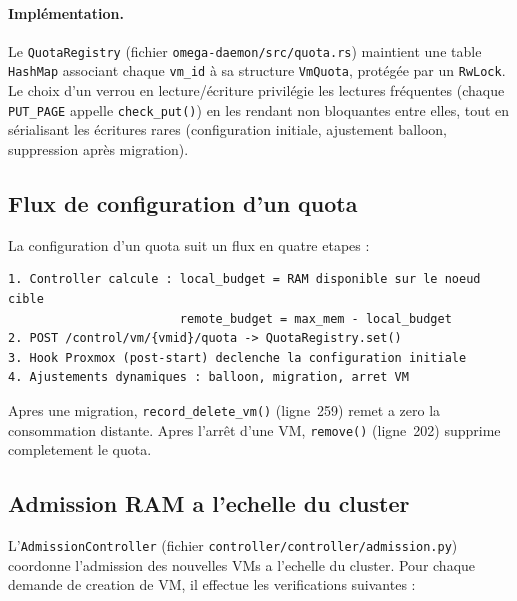 \paragraph{Implémentation.}
Le \texttt{QuotaRegistry} (fichier \texttt{omega-daemon/src/quota.rs}) maintient une table \texttt{HashMap} associant chaque \texttt{vm\_id} à sa structure \texttt{VmQuota}, protégée par un \texttt{RwLock}. Le choix d'un verrou en lecture/écriture privilégie les lectures fréquentes (chaque \texttt{PUT\_PAGE} appelle \texttt{check\_put()}) en les rendant non bloquantes entre elles, tout en sérialisant les écritures rares (configuration initiale, ajustement balloon, suppression après migration).

\subsection{Flux de configuration d'un quota}
\label{subsec:flux-quota}

La configuration d'un quota suit un flux en quatre etapes :

\begin{verbatim}
1. Controller calcule : local_budget = RAM disponible sur le noeud cible
                        remote_budget = max_mem - local_budget
2. POST /control/vm/{vmid}/quota -> QuotaRegistry.set()
3. Hook Proxmox (post-start) declenche la configuration initiale
4. Ajustements dynamiques : balloon, migration, arret VM
\end{verbatim}

Apres une migration, \texttt{record\_delete\_vm()} (ligne~259) remet a zero la consommation distante. Apres l'arr\^et d'une VM, \texttt{remove()} (ligne~202) supprime completement le quota.

\subsection{Admission RAM a l'echelle du cluster}
\label{subsec:admission-ram}

L'\texttt{AdmissionController} (fichier \texttt{controller/controller/admission.py}) coordonne l'admission des nouvelles VMs a l'echelle du cluster. Pour chaque demande de creation de VM, il effectue les verifications suivantes :

